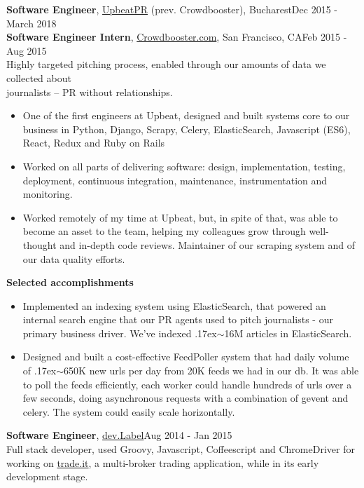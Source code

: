 \documentclass[line, margin]{resume}
\newcommand{\bettertilde}{\raise.17ex\hbox{$\scriptstyle\mathtt{\sim}$}}
\begin{document}
\begin{resume}
\textbf{Software Engineer}, \href{http://upbeatpr.com}{UpbeatPR} (prev. Crowdbooster), Bucharest\hfill Dec 2015 - March 2018\\
\textbf{Software Engineer Intern}, \href{http://crowdbooster.com/}{Crowdbooster.com}, San Francisco, CA\hfill Feb 2015 - Aug 2015\\
Highly targeted pitching process, enabled through our amounts of data we collected about\\ journalists -- PR without relationships.
\begin{itemize} \itemsep -2pt  %
	\item One of the first engineers at Upbeat, designed and built systems core to our business in Python, Django, Scrapy, Celery, ElasticSearch, Javascript (ES6), React, Redux and Ruby on Rails
    \item Worked on all parts of delivering software: design, implementation, testing, deployment, continuous integration, maintenance, instrumentation and monitoring.
	\item Worked remotely  of my time at Upbeat, but, in spite of that, was able to become an asset to the team, helping my colleagues grow through well-thought and in-depth code reviews. Maintainer of our scraping system and of our data quality efforts.
\end{itemize}\vspace{-2.5mm}
\textbf{Selected accomplishments}
\begin{itemize} \itemsep -2pt  %
	\item Implemented an indexing system using ElasticSearch, that powered an internal search engine that our PR agents used to pitch journalists - our primary business driver. We've indexed \bettertilde16M articles in ElasticSearch.
	\item Designed and built a cost-effective FeedPoller system that had daily volume of \bettertilde650K new urls per day from 20K feeds we had in our db. It was able to poll the feeds efficiently, each worker could handle hundreds of urls over a few seconds, doing asynchronous requests with a combination of gevent and celery. The system could easily scale horizontally.
\end{itemize}

\textbf{Software Engineer}, \href{http://devlabel.com/}{dev.Label}\hfill Aug 2014 - Jan 2015\\
Full stack developer, used Groovy, Javascript, Coffeescript and ChromeDriver for working on \href{https://www.trade.it/}{trade.it}, a multi-broker trading application, while in its early development stage.


\end{resume}
\end{document}
